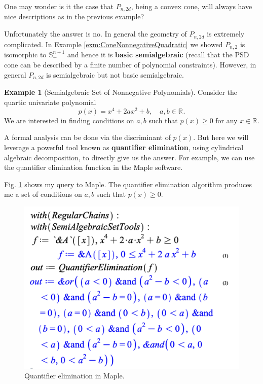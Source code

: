 \documentclass[
]{book}
\theoremstyle{definition}
\theoremstyle{definition}
\newtheorem{example}{Example}[chapter]
\theoremstyle{definition}
\theoremstyle{definition}
\theoremstyle{remark}
\begin{document}
One may wonder is it the case that \(P_{n,2d}\), being a convex cone, will always have nice descriptions as in the previous example?

Unfortunately the answer is no. In general the geometry of \(P_{n,2d}\) is extremely complicated. In Example \ref{exm:ConeNonnegativeQuadratic} we showed \(P_{n,2}\) is isomorphic to \(\mathbb{S}^{n+1}_{+}\) and hence it is \textbf{basic semialgebraic} (recall that the PSD cone can be described by a finite number of polynomial constraints). However, in general \(P_{n,2d}\) is semialgebraic but not basic semialgebraic.

\begin{example}[Semialgebraic Set of Nonnegative Polynomials]
\protect\hypertarget{exm:DegreeFourNonnegative}{}\label{exm:DegreeFourNonnegative}Consider the quartic univariate polynomial
\[
p(x) = x^4 + 2ax^2 + b, \quad a,b \in \mathbb{R}^{}.
\]
We are interested in finding conditions on \(a,b\) such that \(p(x) \geq 0\) for any \(x \in \mathbb{R}^{}\).

A formal analysis can be done via the discriminant of \(p(x)\). But here we will leverage a powerful tool known as \textbf{quantifier elimination}, using cylindrical algebraic decomposition, to directly give us the answer. For example, we can use the quantifier elimination function in the Maple software.

Fig. \ref{fig:QuantifierEliminationQuartic} shows my query to Maple. The quantifier elimination algorithm produces me a set of conditions on \(a,b\) such that \(p(x) \geq 0\).

\begin{figure}

{\centering \includegraphics[width=0.6\linewidth]{images/quantifier_elimination_quartic} 

}

\caption{Quantifier elimination in Maple.}\label{fig:QuantifierEliminationQuartic}
\end{figure}


\end{example}
\end{document}
